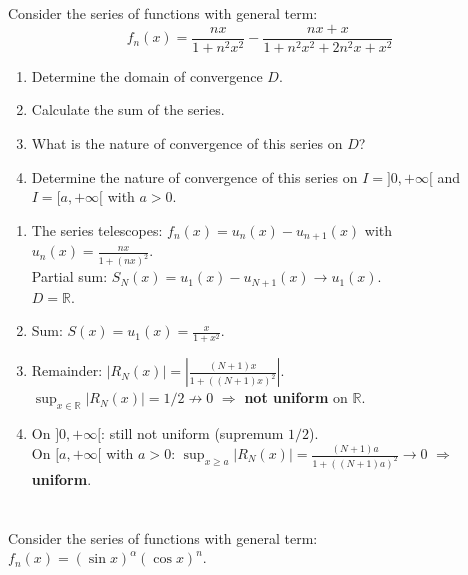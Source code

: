 \documentclass[12pt]{article}
\begin{document}
\section{}
Consider the series of functions with general term: 
$$f_n(x) = \frac{nx}{1+n^2x^2} - \frac{nx+x}{1+n^2x^2+2n^2x+x^2}$$

\begin{enumerate}
    \item Determine the domain of convergence $D$.
    \item Calculate the sum of the series.
    \item What is the nature of convergence of this series on $D$?
    \item Determine the nature of convergence of this series on $I = ]0, +\infty[$ and $I = [a, +\infty[$ with $a > 0$.
\end{enumerate}

\begin{correctionbox}
\begin{enumerate}
    \item The series telescopes: $f_n(x)=u_n(x)-u_{n+1}(x)$ with $u_n(x)=\frac{nx}{1+(nx)^2}$. \\
    Partial sum: $S_N(x)=u_1(x)-u_{N+1}(x) \to u_1(x)$. \\
    $D = \mathbb{R}$.

    \item Sum: $S(x)=u_1(x)=\frac{x}{1+x^2}$.

    \item Remainder: $|R_N(x)|=\left|\frac{(N+1)x}{1+((N+1)x)^2}\right|$. \\
    $\sup_{x\in\mathbb{R}}|R_N(x)|=1/2 \not\to0$ $\Rightarrow$ \textbf{not uniform} on $\mathbb{R}$.

    \item On $]0,+\infty[$: still not uniform (supremum $1/2$). \\
    On $[a,+\infty[$ with $a>0$: $\sup_{x\geq a}|R_N(x)|=\frac{(N+1)a}{1+((N+1)a)^2}\to0$ $\Rightarrow$ \textbf{uniform}.
\end{enumerate}
\end{correctionbox}

\section{}
Consider the series of functions with general term: $f_n(x) = (\sin x)^\alpha (\cos x)^n$.
\end{document}

